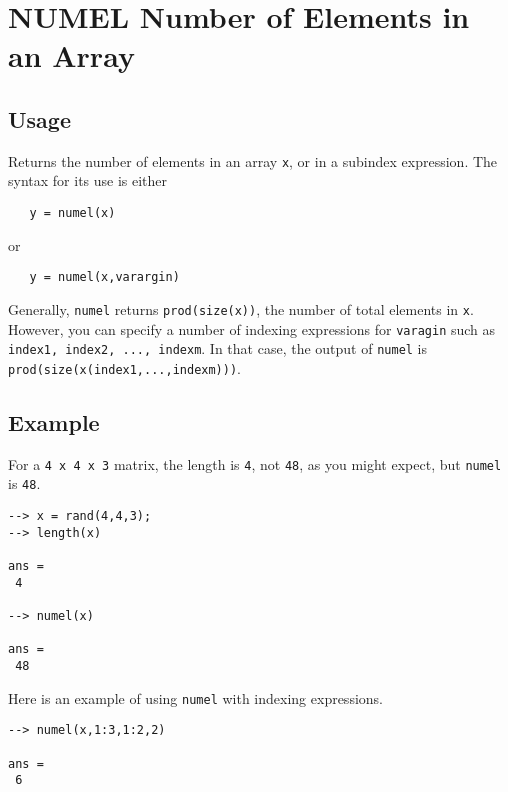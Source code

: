 \section{NUMEL Number of Elements in an Array}

\subsection{Usage}

Returns the number of elements in an array \verb|x|, or in a subindex
expression.  The syntax for its use is either
\begin{verbatim}
   y = numel(x)
\end{verbatim}
or 
\begin{verbatim}
   y = numel(x,varargin)
\end{verbatim}
Generally, \verb|numel| returns \verb|prod(size(x))|, the number of total
elements in \verb|x|.  However, you can specify a number of indexing
expressions for \verb|varagin| such as \verb|index1, index2, ..., indexm|.
In that case, the output of \verb|numel| is 
\verb|prod(size(x(index1,...,indexm)))|.
\subsection{Example}

For a \verb|4 x 4 x 3| matrix, the length is \verb|4|, not \verb|48|, as you 
might expect, but \verb|numel| is \verb|48|.
\begin{verbatim}
--> x = rand(4,4,3);
--> length(x)

ans = 
 4 

--> numel(x)

ans = 
 48 
\end{verbatim}
Here is an example of using \verb|numel| with indexing expressions.
\begin{verbatim}
--> numel(x,1:3,1:2,2)

ans = 
 6 
\end{verbatim}
